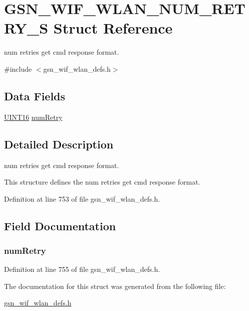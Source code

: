 \hypertarget{a00392}{
\section{GSN\_\-WIF\_\-WLAN\_\-NUM\_\-RETRY\_\-S Struct Reference}
\label{a00392}
}


num retries get cmd response format.  




{\ttfamily \#include $<$gsn\_\-wif\_\-wlan\_\-defs.h$>$}

\subsection*{Data Fields}
\begin{DoxyCompactItemize}
\item 
\hyperlink{a00660_ga09f1a1fb2293e33483cc8d44aefb1eb1}{UINT16} \hyperlink{a00392_af157e20ac31ba778b9c14ff2f8d5fc1d}{numRetry}
\end{DoxyCompactItemize}


\subsection{Detailed Description}
num retries get cmd response format. 

This structure defines the num retries get cmd response format. 

Definition at line 753 of file gsn\_\-wif\_\-wlan\_\-defs.h.



\subsection{Field Documentation}
\hypertarget{a00392_af157e20ac31ba778b9c14ff2f8d5fc1d}{
\subsubsection[{numRetry}]{ {\bf numRetry}}}
\label{a00392_af157e20ac31ba778b9c14ff2f8d5fc1d}


Definition at line 755 of file gsn\_\-wif\_\-wlan\_\-defs.h.



The documentation for this struct was generated from the following file:\begin{DoxyCompactItemize}
\item 
\hyperlink{a00613}{gsn\_\-wif\_\-wlan\_\-defs.h}\end{DoxyCompactItemize}
